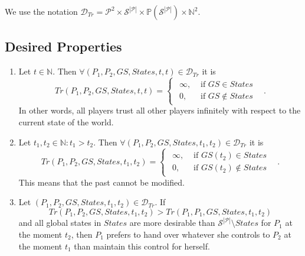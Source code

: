     We use the notation $\mathcal{D}_{Tr} = \mathcal{P}^2 \times \mathcal{S}^{|\mathcal{P}|} \times
    \mathbb{P}\left(\mathcal{S}^{|\mathcal{P}|}\right) \times \mathbb{N}^2$.

  \subsection{Desired Properties}
    \begin{enumerate}
      \item Let $t \in \mathbb{N}$. Then $\forall \left(P_1, P_2, GS, States, t, t\right) \in \mathcal{D}_{Tr}$ it is
      \begin{equation*}
        Tr\left(P_1, P_2, GS, States, t, t\right) =
	\begin{cases}
	\begin{aligned}
	  \infty, & \mbox{ if } GS \in States \\
          0, & \mbox{ if } GS \notin States
	\end{aligned}
	\end{cases} \enspace.
      \end{equation*}
      In other words, all players trust all other players infinitely with respect to the current state of the world.

      \item Let $t_1, t_2 \in \mathbb{N}: t_1 > t_2$. Then $\forall \left(P_1, P_2, GS, States, t_1, t_2\right) \in
      \mathcal{D}_{Tr}$ it is
      \begin{equation*}
        Tr\left(P_1, P_2, GS, States, t_1, t_2\right) =
	\begin{cases}
	\begin{aligned}
	  \infty, & \mbox{ if } GS\left(t_2\right) \in States \\
          0, & \mbox{ if } GS\left(t_2\right) \notin States
	\end{aligned}
	\end{cases} \enspace.
      \end{equation*}
      This means that the past cannot be modified.

      \item Let $\left(P_1, P_2, GS, States, t_1, t_2\right) \in \mathcal{D}_{Tr}$. If 
      \begin{equation*}
        Tr\left(P_1, P_2, GS, States, t_1, t_2\right) > Tr\left(P_1, P_1, GS, States, t_1, t_2\right)
      \end{equation*}
      and all global states in $States$ are more desirable than $\mathcal{S}^{|\mathcal{P}|} \setminus States$ for $P_1$ at
      the moment $t_2$, then $P_1$ prefers to hand over whatever she controls to $P_2$ at the moment $t_1$ than maintain this
      control for herself.


\end{enumerate}
